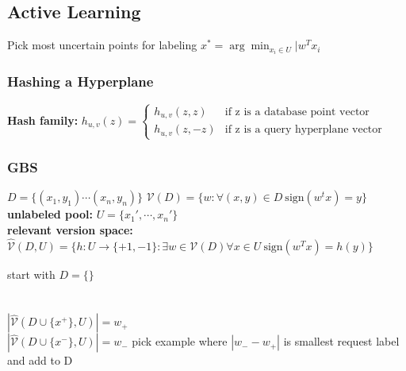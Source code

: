\documentclass[7pt,parskip]{scrartcl}
\begin{document}
\begin{multicols*}{3}
\subsection{Active Learning} %
\label{sub:active_learning}
Pick most uncertain points for labeling 
$x^{\ast} = \arg\min_{x_i\in U}|w^Tx_i$ \\
\subsubsection{Hashing a Hyperplane} %
\label{ssub:hashing_a_hyperplane}
\textbf{Hash family: } $h_{u,v}(z) = \begin{cases}
	h_{u,v}(z,z) & \text{if z is a database point vector} \\
	h_{u,v}(z,-z) & \text{if z is a query hyperplane vector}
\end{cases}$ \\
\subsubsection{GBS} %
\label{ssub:gbs}
$D = \{(x_1,y_1) \cdots (x_n,y_n) \}$ \qquad 
$\mathcal{V}(D) = \{w: \forall(x,y) \in D \ \mathrm{sign}(w^tx) = y \}$ \\
\textbf{unlabeled pool: } $U = \{x_1',\cdots,x_n'\}$ \\
\textbf{relevant version space: } $\hat{\mathcal{V}}(D,U) = \{h:U \to \{+1,-1\} : \exists w \in \mathcal{V}(D) \forall x\in U \ \mathrm{sign}(w^Tx) = h(y) \}$
\begin{mdframed}
	\begin{algorithmic}
		\State start with $D=\{\}$ \\
		 \\
			 \\
				\State $|\hat{\mathcal{V}}(D\cup \{x^+\},U)| = w_+$ \\
				\State $|\hat{\mathcal{V}}(D\cup \{x^-\},U)| = w_-$
			\EndFor
			\State pick example where $|w_- - w_+|$ is smallest
			\State request label and add to D
		\EndWhile
	\end{algorithmic}
\end{mdframed}

\end{multicols*}
\end{document}
